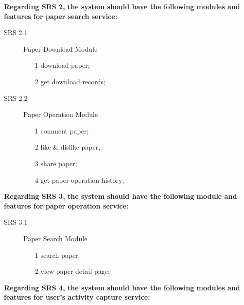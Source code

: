 \noindent
\textbf{Regarding SRS 2, the system should have the following modules and features for paper search service:}

\begin{description}
	\item[SRS 2.1] Paper Download Module
		\begin{itemize}
			\item [1]
			      download paper;
			\item [2]
			      get download records;
		\end{itemize}
	\item[SRS 2.2] Paper Operation Module
		\begin{itemize}
			\item [1]
			      comment paper;
			\item [2]
			      like \& dislike paper;
			\item [3]
			      share paper;
			\item [4]
			      get paper operation history;
		\end{itemize}
\end{description}

\noindent
\textbf{Regarding SRS 3, the system should have the following module and features for paper operation service:}

\begin{description}
	\item[SRS 3.1] Paper Search Module
		\begin{itemize}
			\item [1]
			      search paper;
			\item [2]
			      view paper detail page;
		\end{itemize}
\end{description}

\noindent
\textbf{Regarding SRS 4, the system should have the following modules and features for user's activity capture service:}

